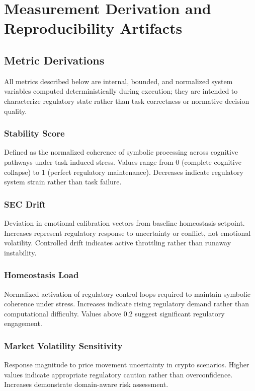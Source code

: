 \documentclass[12pt,a4paper]{article}
\begin{document}
\section{Measurement Derivation and Reproducibility Artifacts}

\subsection{Metric Derivations}

All metrics described below are internal, bounded, and normalized system variables computed deterministically during execution; they are intended to characterize regulatory state rather than task correctness or normative decision quality.

\subsubsection{Stability Score}
Defined as the normalized coherence of symbolic processing across cognitive pathways under task-induced stress. Values range from 0 (complete cognitive collapse) to 1 (perfect regulatory maintenance). Decreases indicate regulatory system strain rather than task failure.

\subsubsection{SEC Drift}
Deviation in emotional calibration vectors from baseline homeostasis setpoint. Increases represent regulatory response to uncertainty or conflict, not emotional volatility. Controlled drift indicates active throttling rather than runaway instability.

\subsubsection{Homeostasis Load}
Normalized activation of regulatory control loops required to maintain symbolic coherence under stress. Increases indicate rising regulatory demand rather than computational difficulty. Values above 0.2 suggest significant regulatory engagement.

\subsubsection{Market Volatility Sensitivity}
Response magnitude to price movement uncertainty in crypto scenarios. Higher values indicate appropriate regulatory caution rather than overconfidence. Increases demonstrate domain-aware risk assessment.
\end{document}
